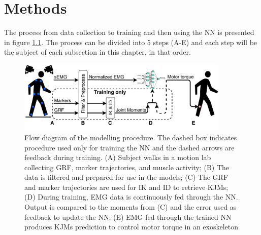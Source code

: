\documentclass[../main.tex]{subfiles}
\begin{document}
\chapter{Methods}
\label{sec:methods}
The process from data collection to training and then using the \ac{NN} is presented in figure \ref{fig:process-diagram}. 
The process can be divided into 5 steps (A-E) and each step will be the subject of each subsection in this chapter, in that order.
\begin{figure}[ht]
    \centering
    \includegraphics[width=0.9\textwidth]{img/ProcessDiagram}
    \caption{Flow diagram of the modelling procedure. The dashed box indicates procedure used only for training the \ac{NN} and the dashed arrows are feedback during training. (A) Subject walks in a motion lab collecting \acf{GRF}, marker trajectories, and muscle activity; (B) The data is filtered and prepared for use in the models; (C) The \ac{GRF} and marker trajectories are used for \ac{IK} and \ac{ID} to retrieve \acp{KJM}; (D) During training, \ac{EMG} data is continuously fed through the \ac{NN}. Output is compared to the moments from (C) and the error used as feedback to update the \ac{NN}; (E) \ac{EMG} fed through the trained \ac{NN} produces \acp{KJM} prediction to control motor torque in an exoskeleton}
    \label{fig:process-diagram}
\end{figure}
\end{document}
